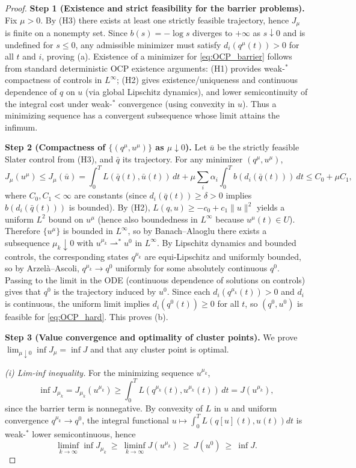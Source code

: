\documentclass{article} %
\begin{document}
\begin{proof}
\textbf{Step 1 (Existence and strict feasibility for the barrier problems).}
Fix $\mu>0$. By (H3) there exists at least one strictly feasible trajectory, hence $J_\mu$ is finite on a nonempty set.
Since $b(s)=-\log s$ diverges to $+\infty$ as $s\downarrow 0$ and is undefined for $s\le 0$,
any admissible minimizer must satisfy $d_i(q^\mu(t))>0$ for all $t$ and $i$, proving (a).
Existence of a minimizer for \cref{eq:OCP_barrier} follows from standard deterministic OCP existence arguments:
(H1) provides weak-$^\ast$ compactness of controls in $L^\infty$; (H2) gives existence/uniqueness and continuous dependence
of $q$ on $u$ (via global Lipschitz dynamics), and lower semicontinuity of the integral cost under weak-$^\ast$ convergence
(using convexity in $u$). Thus a minimizing sequence has a convergent subsequence whose limit attains the infimum.

\textbf{Step 2 (Compactness of $\{(q^\mu,u^\mu)\}$ as $\mu\downarrow 0$).}
Let $\bar u$ be the strictly feasible Slater control from (H3), and $\bar q$ its trajectory.
For any minimizer $(q^\mu,u^\mu)$,
\[
J_\mu(u^\mu)\le J_\mu(\bar u)=\int_0^T L(\bar q(t),\bar u(t))\,dt + \mu\sum_i \alpha_i\int_0^T b(d_i(\bar q(t)))\,dt
\le C_0 + \mu C_1,
\]
where $C_0,C_1<\infty$ are constants (since $d_i(\bar q(t))\ge\delta>0$ implies $b(d_i(\bar q(t)))$ is bounded).
By (H2), $L(q,u)\ge -c_0+c_1\|u\|^2$ yields a uniform $L^2$ bound on $u^\mu$ (hence also boundedness in $L^\infty$ because $u^\mu(t)\in U$).
Therefore $\{u^\mu\}$ is bounded in $L^\infty$, so by Banach--Alaoglu there exists a subsequence $\mu_k\downarrow 0$
with $u^{\mu_k}\rightharpoonup^\ast u^0$ in $L^\infty$.
By Lipschitz dynamics and bounded controls, the corresponding states $q^{\mu_k}$ are equi-Lipschitz and uniformly bounded,
so by Arzel\`a--Ascoli, $q^{\mu_k}\to q^0$ uniformly for some absolutely continuous $q^0$.
Passing to the limit in the ODE (continuous dependence of solutions on controls) gives that $q^0$ is the trajectory induced by $u^0$.
Since each $d_i(q^{\mu_k}(t))>0$ and $d_i$ is continuous, the uniform limit implies $d_i(q^0(t))\ge 0$ for all $t$,
so $(q^0,u^0)$ is feasible for \cref{eq:OCP_hard}. This proves (b).

\textbf{Step 3 (Value convergence and optimality of cluster points).}
We prove $\lim_{\mu\downarrow 0}\inf J_\mu = \inf J$ and that any cluster point is optimal.

\emph{(i) {Lim-inf} inequality.}
For the minimizing sequence $u^{\mu_k}$,
\[
\inf J_{\mu_k}=J_{\mu_k}(u^{\mu_k}) \ge \int_0^T L(q^{\mu_k}(t),u^{\mu_k}(t))\,dt = J(u^{\mu_k}),
\]
since the barrier term is nonnegative.
By convexity of $L$ in $u$ and uniform convergence $q^{\mu_k}\to q^0$, the integral functional $u\mapsto\int_0^T L(q[u](t),u(t))dt$
is weak-$^\ast$ lower semicontinuous, hence
\[
\liminf_{k\to\infty} \inf J_{\mu_k} \ \ge\ \liminf_{k\to\infty} J(u^{\mu_k})\ \ge\ J(u^0)\ \ge\ \inf J.
\]


\end{proof}
\end{document}
